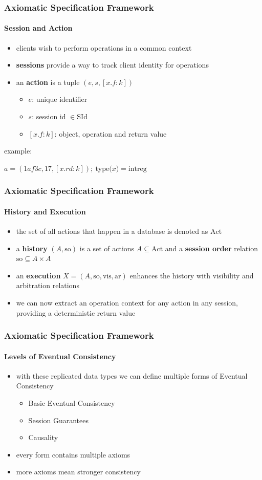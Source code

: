 \documentclass[11pt]{beamer}
\begin{document}
\begin{frame}
\frametitle{Axiomatic Specification Framework}
\framesubtitle{Session and Action}
\begin{itemize}
\item clients wish to perform operations in a common context
\item \textbf{sessions} provide a way to track client identity for operations
\item an \textbf{action} is a tuple \((e,s,[x.f:k])\)
\begin{itemize}
\item \(e\): unique identifier
\item \(s\): session id \(\in \mathrm{SId}\)
\item \([x.f:k]\): object, operation and return value
\end{itemize}
\end{itemize}
\pause
example:

\begin{center}
\(a = (1af3c, 17, [x.rd: k]);\ \mathrm{type(}x\mathrm{)} = \mathrm{intreg}\)
\end{center}
\end{frame}

\begin{frame}
\frametitle{Axiomatic Specification Framework}
\framesubtitle{History and Execution}
\begin{itemize}
\item the set of all actions that happen in a database is denoted as \(\mathrm{Act}\)
\item a \textbf{history} \((A,\mathrm{so})\) is a set of actions \(A \subseteq \mathrm{Act}\) and a \textbf{session order} relation \(\mathrm{so} \subseteq A \times A \)
\item an \textbf{execution} \(X = (A, \mathrm{so, vis, ar})\) enhances the history with visibility and arbitration relations
\item we can now extract an operation context for any action in any session, providing a deterministic return value
\end{itemize}

\end{frame}

\begin{frame}
\frametitle{Axiomatic Specification Framework}
\framesubtitle{Levels of Eventual Consistency}
\begin{itemize}
\item with these replicated data types we can define multiple forms of Eventual Consistency
\begin{itemize}
\item Basic Eventual Consistency
\item Session Guarantees
\item Causality
\end{itemize}
\item every form contains multiple axioms
\item more axioms mean stronger consistency
\end{itemize}
\end{frame}
\end{document}
